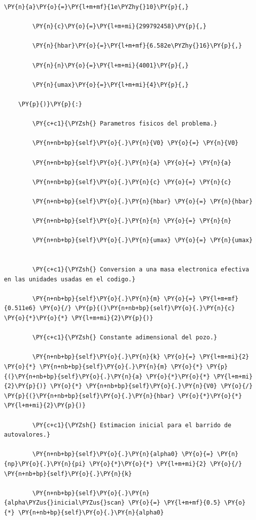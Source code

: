 \documentclass[11pt]{article}
\makeatletter
\def\PY@reset{\let\PY@it=\relax \let\PY@bf=\relax \let\PY@ul=\relax \let\PY@tc=\relax \let\PY@bc=\relax \let\PY@ff=\relax}
\def\PY@tok#1{\csname PY@tok@#1\endcsname}
\def\PY@toks#1+{\ifx\relax#1\empty\else \PY@tok{#1}\expandafter\PY@toks\fi}
\def\PY@do#1{\PY@bc{\PY@tc{\PY@ul{\PY@it{\PY@bf{\PY@ff{#1}}}}}}}
\def\PY#1#2{\PY@reset\PY@toks#1+\relax+\PY@do{#2}}
\makeatother
\begin{document}
\begin{tcolorbox}[breakable, size=fbox, boxrule=1pt, pad at break*=1mm,colback=cellbackground, colframe=cellborder]
\begin{Verbatim}[commandchars=\\\{\}]
        \PY{n}{a}\PY{o}{=}\PY{l+m+mf}{1e\PYZhy{}10}\PY{p}{,}

        \PY{n}{c}\PY{o}{=}\PY{l+m+mi}{299792458}\PY{p}{,}

        \PY{n}{hbar}\PY{o}{=}\PY{l+m+mf}{6.582e\PYZhy{}16}\PY{p}{,}

        \PY{n}{n}\PY{o}{=}\PY{l+m+mi}{4001}\PY{p}{,}

        \PY{n}{umax}\PY{o}{=}\PY{l+m+mi}{4}\PY{p}{,}

    \PY{p}{)}\PY{p}{:}

        \PY{c+c1}{\PYZsh{} Parametros fisicos del problema.}

        \PY{n+nb+bp}{self}\PY{o}{.}\PY{n}{V0} \PY{o}{=} \PY{n}{V0}

        \PY{n+nb+bp}{self}\PY{o}{.}\PY{n}{a} \PY{o}{=} \PY{n}{a}

        \PY{n+nb+bp}{self}\PY{o}{.}\PY{n}{c} \PY{o}{=} \PY{n}{c}

        \PY{n+nb+bp}{self}\PY{o}{.}\PY{n}{hbar} \PY{o}{=} \PY{n}{hbar}

        \PY{n+nb+bp}{self}\PY{o}{.}\PY{n}{n} \PY{o}{=} \PY{n}{n}

        \PY{n+nb+bp}{self}\PY{o}{.}\PY{n}{umax} \PY{o}{=} \PY{n}{umax}


        \PY{c+c1}{\PYZsh{} Conversion a una masa electronica efectiva en las unidades usadas en el codigo.}

        \PY{n+nb+bp}{self}\PY{o}{.}\PY{n}{m} \PY{o}{=} \PY{l+m+mf}{0.511e6} \PY{o}{/} \PY{p}{(}\PY{n+nb+bp}{self}\PY{o}{.}\PY{n}{c} \PY{o}{*}\PY{o}{*} \PY{l+m+mi}{2}\PY{p}{)}

        \PY{c+c1}{\PYZsh{} Constante adimensional del pozo.}

        \PY{n+nb+bp}{self}\PY{o}{.}\PY{n}{k} \PY{o}{=} \PY{l+m+mi}{2} \PY{o}{*} \PY{n+nb+bp}{self}\PY{o}{.}\PY{n}{m} \PY{o}{*} \PY{p}{(}\PY{n+nb+bp}{self}\PY{o}{.}\PY{n}{a} \PY{o}{*}\PY{o}{*} \PY{l+m+mi}{2}\PY{p}{)} \PY{o}{*} \PY{n+nb+bp}{self}\PY{o}{.}\PY{n}{V0} \PY{o}{/} \PY{p}{(}\PY{n+nb+bp}{self}\PY{o}{.}\PY{n}{hbar} \PY{o}{*}\PY{o}{*} \PY{l+m+mi}{2}\PY{p}{)}

        \PY{c+c1}{\PYZsh{} Estimacion inicial para el barrido de autovalores.}

        \PY{n+nb+bp}{self}\PY{o}{.}\PY{n}{alpha0} \PY{o}{=} \PY{n}{np}\PY{o}{.}\PY{n}{pi} \PY{o}{*}\PY{o}{*} \PY{l+m+mi}{2} \PY{o}{/} \PY{n+nb+bp}{self}\PY{o}{.}\PY{n}{k}

        \PY{n+nb+bp}{self}\PY{o}{.}\PY{n}{alpha\PYZus{}inicial\PYZus{}scan} \PY{o}{=} \PY{l+m+mf}{0.5} \PY{o}{*} \PY{n+nb+bp}{self}\PY{o}{.}\PY{n}{alpha0}



\end{Verbatim}
\end{tcolorbox}
\end{document}
